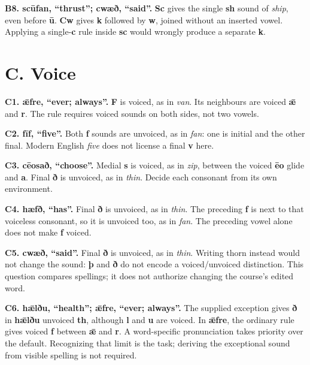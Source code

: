 \textbf{B8. scūfan, “thrust”; cwæð, “said”.} \textbf{Sc} gives the single \textbf{sh} sound of \emph{ship}, even before \textbf{ū}. \textbf{Cw} gives \textbf{k} followed by \textbf{w}, joined without an inserted vowel. Applying a single-\textbf{c} rule inside \textbf{sc} would wrongly produce a separate \textbf{k}.

\section*{C. Voice}

\textbf{C1. ǣfre, “ever; always”.} \textbf{F} is voiced, as in \emph{van}. Its neighbours are voiced \textbf{ǣ} and \textbf{r}. The rule requires voiced sounds on both sides, not two vowels.

\textbf{C2. fīf, “five”.} Both \textbf{f} sounds are unvoiced, as in \emph{fan}: one is initial and the other final. Modern English \emph{five} does not license a final \textbf{v} here.

\textbf{C3. cēosað, “choose”.} Medial \textbf{s} is voiced, as in \emph{zip}, between the voiced \textbf{ēo} glide and \textbf{a}. Final \textbf{ð} is unvoiced, as in \emph{thin}. Decide each consonant from its own environment.

\textbf{C4. hæfð, “has”.} Final \textbf{ð} is unvoiced, as in \emph{thin}. The preceding \textbf{f} is next to that voiceless consonant, so it is unvoiced too, as in \emph{fan}. The preceding vowel alone does not make \textbf{f} voiced.

\textbf{C5. cwæð, “said”.} Final \textbf{ð} is unvoiced, as in \emph{thin}. Writing thorn instead would not change the sound: \textbf{þ} and \textbf{ð} do not encode a voiced/\allowbreak{}unvoiced distinction. This question compares spellings; it does not authorize changing the course's edited word.

\textbf{C6. hǣlðu, “health”; ǣfre, “ever; always”.} The supplied exception gives \textbf{ð} in \textbf{hǣlðu} unvoiced \textbf{th}, although \textbf{l} and \textbf{u} are voiced. In \textbf{ǣfre}, the ordinary rule gives voiced \textbf{f} between \textbf{ǣ} and \textbf{r}. A word-specific pronunciation takes priority over the default. Recognizing that limit is the task; deriving the exceptional sound from visible spelling is not required.

